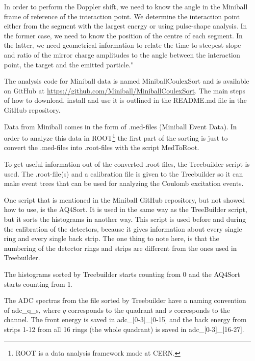 \documentclass[twoside,english]{uiofysmaster/uiofysmaster}
\begin{document}
In order to perform the Doppler shift, we need to know the angle in the Miniball frame of reference of the interaction point. We determine the interaction point either from the segment with the largest energy or using pulse-shape analysis. In the former case, we need to know the position of the centre of each segment. In the latter, we need geometrical information to relate the time-to-steepest slope and ratio of the mirror charge amplitudes to the angle between the interaction point, the target and the emitted particle."





The analysis code for Miniball data is named MiniballCoulexSort and is available on GitHub at \url{https://github.com/Miniball/MiniballCoulexSort}. 
The main steps of how to download, install and use it is outlined in the README.md file in the GitHub repository. 

Data from Miniball comes in the form of .med-files (Miniball Event Data). 
In order to analyze this data in ROOT\footnote{ROOT is a data analysis framework made at CERN.} the first part of the sorting is just to convert the .med-files into .root-files with the script MedToRoot. 

To get useful information out of the converted .root-files, the Treebuilder script is used. 
The .root-file(s) and a calibration file is given to the Treebuilder so it can make event trees that can be used for analyzing the Coulomb excitation events. 

One script that is mentioned in the Miniball GitHub repository, but not showed how to use, is the AQ4Sort. It is used in the same way as the TreeBuilder script, but it sorts the histograms in another way. 
This script is used before and during the calibration of the detectors, because it gives information about every single ring and every single back strip. The one thing to note here, is that the numbering of the detector rings and strips are different from the ones used in Treebuilder. 


The histograms sorted by Treebuilder starts counting from 0 and the AQ4Sort starts counting from 1. 

The ADC spectras from the file sorted by Treebuilder have a naming convention of adc\_q\_s, where $q$ corresponds to the quadrant and $s$ corresponds to the channel. The front energy is saved in adc\_[0-3]\_[0-15] and the back energy from strips 1-12 from all 16 rings (the whole quadrant) is saved in adc\_[0-3]\_[16-27].
\end{document}
